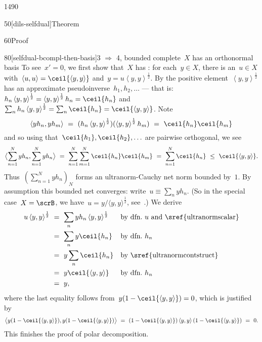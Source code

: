 \begin{parsec}{1490}
\begin{point}{50}[dils-selfdual]{Theorem}
\begin{point}{60}{Proof}
\begin{point}{80}[selfdual-bcompl-then-basis]{3
    $\Rightarrow$ 4, bounded complete~$X$ has an orthonormal basis}
To see~$x'=0$, we
first show that~$X$ has :
    for each~$y \in X$, there is an~$u\in X$
    with~$\left<u,u\right> = \ceil{\left<y,y\right>}$
        and~$y=u\left<y,y\right>^{\frac{1}{2}}$.
By 
    the positive element~$\left<y,y\right>^{\frac{1}{2}}$
    has an approximate pseudoinverse~$h_1, h_2, \ldots$
    --- that is:
    $h_n \left<y,y\right>^{\frac{1}{2}} =
         \left<y,y\right>^{\frac{1}{2}} h_n
         = \ceil{h_n}$
         and~$\sum_n h_n \left<y,y\right>^{\frac{1}{2}} = \sum_n \ceil{h_n}
                    = \ceil{\left<y,y\right>}$. Note
\begin{equation*}
    \left<yh_n,yh_m\right> \ = \ 
        (h_n \left<y,y\right>^{\frac{1}{2}})
        (\left<y,y\right>^{\frac{1}{2}} h_m) \ =\  \ceil{h_n}\ceil{h_m}
\end{equation*}
and so using that~$\ceil{h_1}, \ceil{h_2}, \ldots$ are pairwise orthogonal,
    we see
\begin{equation*}
    \bigl< \sum_{n=1}^N y h_n, \sum_{n=1}^N y h_n \bigr> 
    \ =\  \sum_{n=1}^N \sum_{m=1}^N \ceil{h_n} \ceil{h_m}
                \ =\  \sum_{n=1}^N \ceil{h_n}
                \ \leq\  \ceil{\left<y,y\right>}.
\end{equation*}
Thus~$( \sum_{n=1}^N y h_n)_N$ forms an ultranorm-Cauchy net
    norm bounded by~$1$.
By assumption this bounded net converges:
    write~$u \equiv \sum_n yh_n$.
(So in the special case~$X = \scrB$,
    we have~$u = y / \langle y,y \rangle^{\frac{1}{2}}$,
    see~.)
We derive
\begin{align*}
u \left<y,y\right>^{\frac{1}{2}}
&\ =\  \sum_n yh_n \left<y,y\right>^{\frac{1}{2}} 
    && \text{by dfn.~$u$ and \sref{ultranormscalar}}
\\
&\ =\  \sum_n y \ceil{h_n} 
    && \text{by dfn.~$h_n$}\\
    &\ =\  y \sum_n\ceil{h_n}
&& \text{by \sref{ultranormcontstruct}} \\
&\ =\  y \ceil{\left<y,y\right>} && \text{by dfn.~$h_n$}\\
&\ =\  y,
\end{align*}
where the last equality 
follows from~$y (1- \ceil{\left<y,y\right>})=0$,
    which is justified by
\begin{equation*}
    \bigl<
        y (1- \ceil{\left<y,y\right>}),
        y (1- \ceil{\left<y,y\right>}) \bigr>
        \ = \ 
        (1- \ceil{\left<y,y\right>}) \left<y,y\right>
        (1- \ceil{\left<y,y\right>})
        \ = \  0.
\end{equation*}
This finishes the proof of polar decomposition.


\end{point}
\end{point}
\end{point}
\end{parsec}
